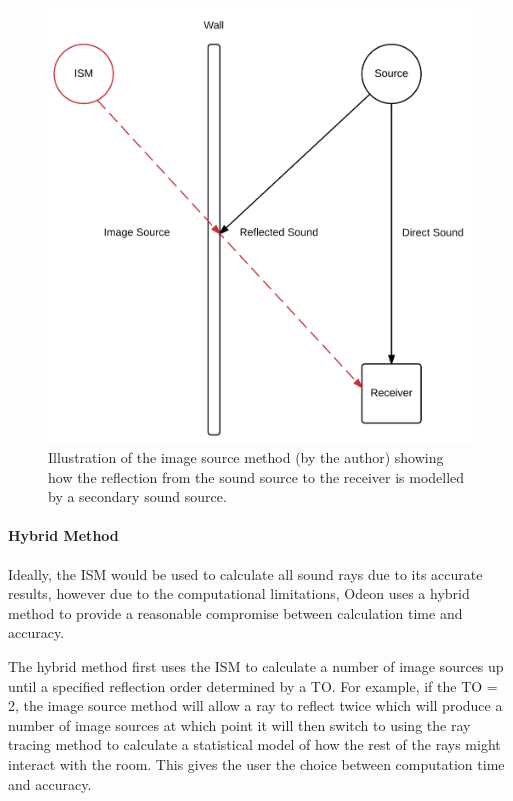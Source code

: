 \documentclass[../../main.tex]{subfiles}
\begin{document}
			\begin{figure}[H]
				\center\includegraphics[scale = 0.4]{Sections/Background/images/ISM.png}
				\caption{Illustration of the image source method (by the author) showing how the reflection from the sound source to the receiver is modelled by a secondary sound source.}
				\label{ISMPic}
			\end{figure}

		\paragraph{Hybrid Method}

			Ideally, the \ac{ISM} would be used to calculate all sound rays due to its accurate results, however due to the computational limitations, Odeon uses a hybrid method to provide a reasonable compromise between calculation time and accuracy.

			The hybrid method first uses the \ac{ISM} to calculate a number of image sources up until a specified reflection order determined by a \ac{TO}. For example, if the \ac{TO} = 2, the image source method will allow a ray to reflect twice which will produce a number of image sources at which point it will then switch to using the ray tracing method to calculate a statistical model of how the rest of the rays might interact with the room. This gives the user the choice between computation time and accuracy.
\end{document}

